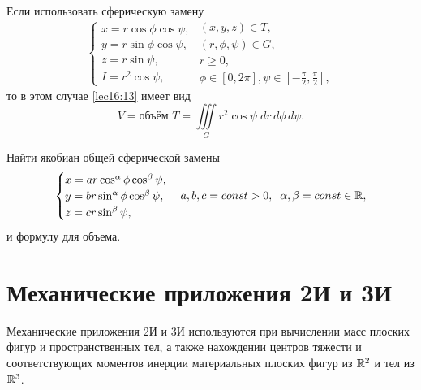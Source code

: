 \documentclass[../../main.tex]{subfiles}
\begin{document}
Если использовать сферическую замену
\begin{equation*}
	\begin{cases}
		x = r \cos \phi \cos \psi,\\
		y = r \sin \phi \cos \psi,\\
		z = r \sin \psi,\\
		I = r^2 \cos \psi, 
	\end{cases}
	\begin{array}{c}
		(x, y, z) \in T, \\
		(r, \phi, \psi) \in G,\\
		r\geq 0,\\
		\phi\in \left[0,2\pi\right],\psi\in\left[-\frac{\pi}2,\frac{\pi}2\right],
	\end{array}
\end{equation*}
то в этом случае \ref{lec16:13} имеет вид
\begin{equation}
\label{lec16:14}
V = \text{объём } T = \iiint\limits_Gr^2\cos\psi\; dr\, d\phi\, d\psi.
\end{equation}
\begin{exercise}
	Найти якобиан общей сферической замены 
	\begin{equation*}
		\begin{cases}
			x = ar \cos^{\alpha}\phi \cos^{\beta}\psi,\\
			y = br \sin^{\alpha}\phi \cos^{\beta}\psi,\\
			z = cr \sin^{\beta}\psi,
		\end{cases}
		a, b, c =const>0, \;\; \alpha,\beta=const \in \mathbb{R},
	\end{equation*}
и формулу для объема.
\end{exercise}

\section{Механические приложения 2И и 3И}
Механические приложения 2И и 3И используются при вычислении масс плоских фигур 
и пространственных тел, а также нахождении центров
тяжести и соответствующих моментов инерции материальных плоских фигур из 
$\mathbb{R}^2$ и тел из $\mathbb{R}^3$.
\end{document}
